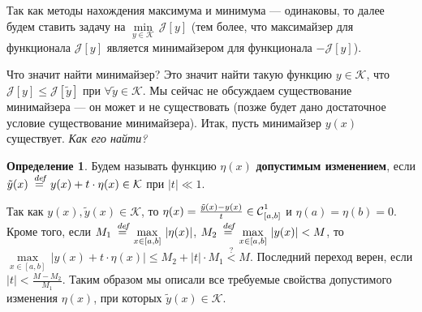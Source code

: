 \documentclass[12pt,a4paper,openany,fleqn]{book}
\newcommand {\defeq}{\stackrel{\hspace{0.09 cm}de\!f}{=}}
\newcommand {\eqdef}{\defeq}
\newcommand{\Cf}{\ensuremath{\mathcal{C}}}
\newcommand{\J}{\ensuremath{\mathcal{J}}}
\newcommand{\mc}[1]{\ensuremath{\mathcal{#1}}}
\newcommand{\Cfn}[2][]{\ensuremath{\Cf{\mathstrut}^{#2}_{#1}}}
\theoremstyle{definition}
\newtheorem{_def}{Определение}[section]
\begin{document}
	Так как методы нахождения максимума и минимума --- одинаковы, то далее будем ставить задачу на $\min\limits_{y\in\mc{K}}\,\J[y]$ (тем более, что максимайзер для функционала $\J[y]$ является минимайзером для функционала $-\J[y]$). 
	
	Что значит найти минимайзер? Это значит найти такую функцию $y\in\mc{K}$, что $\J[y]\leqslant\J[\tilde{y}]$ при $\forall\tilde{y}\in\mc{K}$. Мы сейчас не обсуждаем существование минимайзера --- он может и не существовать (позже будет дано достаточное условие существование минимайзера). Итак, пусть минимайзер $y(x)$ существует. \emph{Как его найти?}
	\begin{_def}
		Будем называть функцию $\eta(x)$ \textbf{допустимым изменением}, если \\
		$\tilde{y}(x)\eqdef y(x)+t\cdot\eta(x)\in\mc{K}$ при $|t|\ll1$.
	\end{_def}
	Так как $y(x),\tilde{y}(x)\in\mc{K}$, то $\eta(x)=\frac{\tilde{y}(x)-y(x)}t\in\Cfn[{[a,b]}]{1}$ и $\eta(a)=\eta(b)=0$. Кроме того, если $M_1\eqdef\max\limits_{x\in{[a,b]}}\,|\eta(x)|$, $M_2\eqdef\max\limits_{x\in{[a,b]}}\,|y(x)|<M$, то 
	$\max\limits_{x\in{[a,b]}}\,|y(x)+t\cdot\eta(x)|\leqslant M_2+|t|\cdot M_1\stackrel{?}{<}M$. Последний переход верен, если $|t|<\frac{M-M_2}{M_1}$. Таким образом мы описали все требуемые свойства допустимого изменения $\eta(x)$, при которых $\tilde{y}(x)\in\mc{K}$.
	
\end{document}
